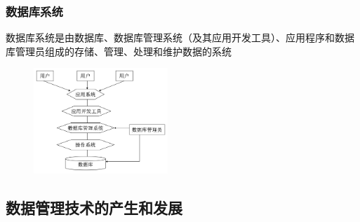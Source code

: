 \subsubsection{数据库系统}
数据库系统是由数据库、数据库管理系统（及其应用开发工具）、应用程序和数据库管理员组成的存储、管理、处理和维护数据的系统
\begin{figure}[H]
    \vspace{-0.5em}
	\centering
	\includegraphics[width=0.45\textwidth]{images/1.1.1.4}
    \vspace{-1em}
\end{figure}

\subsection{数据管理技术的产生和发展}

